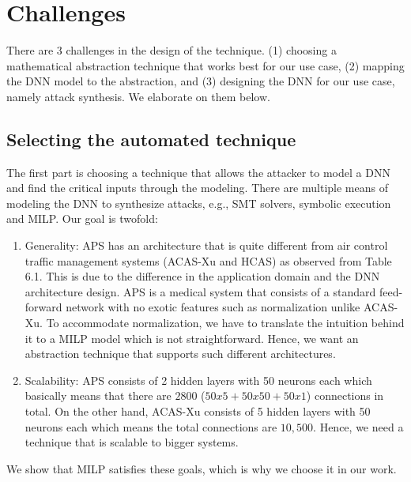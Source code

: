 \section{Challenges}
There are 3 challenges in the design of the technique. 
(1) choosing a mathematical abstraction technique that works best for our use case, 
(2) mapping the \ac{DNN}  model to the abstraction, and 
(3) designing the \ac{DNN}  for our use case, namely attack synthesis. 
We elaborate on them below. 


\subsection{Selecting  the automated technique}
The first part is choosing a technique that allows the attacker to model a DNN and find the critical inputs through the modeling. 
There are multiple means of modeling the DNN to synthesize attacks, e.g., SMT solvers, symbolic execution and MILP.
Our goal is twofold: 
\begin{enumerate}
	\item Generality: \ac{APS} has an architecture that %
	is quite different from air control traffic management systems (\ac{ACAS-Xu} and \ac{HCAS}) as observed from Table 6.1.
	This is due to the difference in the application domain and the \ac{DNN} architecture design. 
	\ac{APS} is a medical system that consists of a standard feed-forward network with no exotic features such as normalization 
	unlike \ac{ACAS-Xu}. 
	To accommodate normalization, we have to translate the intuition behind it to a \ac{MILP} model which is not straightforward.  
	Hence, we want an abstraction technique that supports such different architectures. 
	\item Scalability: \ac{APS} consists of 2 hidden layers with 50 neurons each which basically means that there are $2800$ ($50x5 + 50x50 + 50x1$) connections in total.
	On the other hand, \ac{ACAS-Xu} consists of 5 hidden layers with 50 neurons each which means the total connections are $10,500$. 
	Hence, we need a technique that is scalable to bigger systems.  
	
\end{enumerate}

 We show that \ac{MILP} satisfies these goals, which is why we choose it in our work. %


